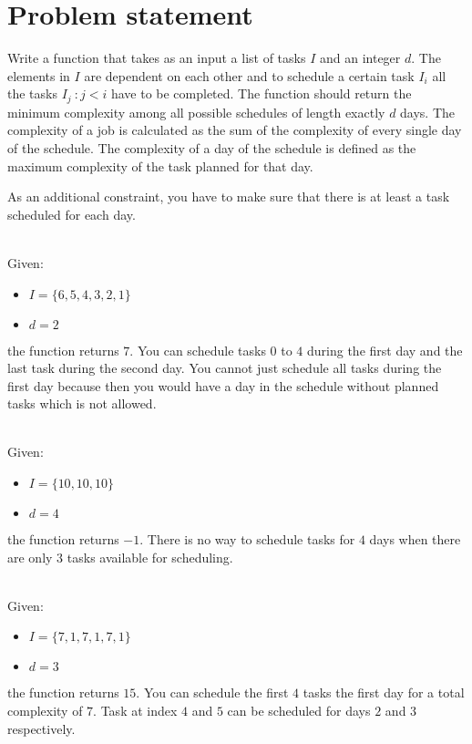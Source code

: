 \section{Problem statement}
\begin{exercise}
    Write a function that takes as an input a list of tasks $I$ and an integer $d$. The elements in
    $I$ are dependent on each other and to schedule a certain task $I_i$ all the tasks $I_j
    \: : j < i$ have to be completed. The function should return the minimum complexity among all possible schedules of length exactly $d$ days. The complexity of a job is calculated as the sum of the complexity of every single day of the schedule. The complexity of a day of the schedule is defined as the maximum complexity of the task planned for that day.

    As an additional constraint, you have to make sure that there is at least a task scheduled for
    each day.
        
    \begin{example}
        \hfill \\
        Given:
        \begin{itemize}
            \item $I = \{6,5,4,3,2,1\}$
            \item $d = 2$
        \end{itemize}
        the function returns $7$. You can schedule tasks $0$ to $4$ during the first day and the
        last task during the second day. You cannot just schedule all tasks during the first day
        because then you would have a day in the schedule without planned tasks which is not
        allowed.
    \end{example}
    
    \begin{example}
        \hfill \\
        Given:
        \begin{itemize}
            \item $I = \{10,10,10\}$
            \item $d = 4$
        \end{itemize}
        the function returns $-1$. There is no way to schedule tasks for $4$ days when there are
        only $3$ tasks available for scheduling.
    \end{example}

        
    \begin{example}
        \hfill \\
        Given:
        \begin{itemize}
            \item $I = \{7,1,7,1,7,1\}$
            \item $d = 3$
        \end{itemize}
        the function returns $15$. You can schedule the first $4$ tasks the first day for a total
        complexity of $7$. Task at index $4$ and $5$ can be scheduled for days $2$ and $3$
        respectively. 


\end{example}
\end{exercise}
